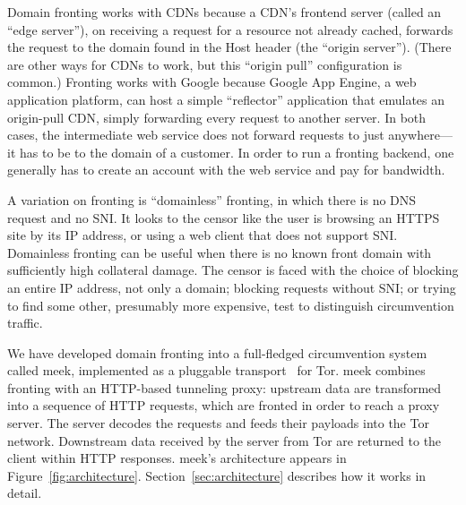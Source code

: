 \documentclass{sig-alternate}
\newcommand{\meek}{meek\xspace}
\begin{document}
Domain fronting works with CDNs because a CDN's frontend server
(called an ``edge server''),
on receiving a request for a resource not already cached,
forwards the request to the domain found in the Host header
(the ``origin server'').
(There are other ways for CDNs to work, but this ``origin pull''
configuration is common.)
Fronting works with Google because Google App Engine, a web application platform,
can host a simple ``reflector'' application that emulates
an origin-pull CDN, simply forwarding every request to another server.
In both cases, the intermediate web service does not forward requests to just anywhere---it
has to be to the domain of a customer.
In order to run a fronting backend,
one generally has to create an account with the web service and pay for bandwidth.

A variation on fronting is ``domainless'' fronting,
in which there is no DNS request and no SNI.
It looks to the censor
like the user is browsing an HTTPS site by its IP address,
or using a web client that does not support SNI.
Domainless fronting can be useful when there is no known front domain
with sufficiently high collateral damage.
The censor is faced with the choice of blocking an entire IP address, not only a domain;
blocking requests without SNI;
or trying to find some other, presumably more expensive, test to distinguish
circumvention traffic.

We have developed domain fronting into a full-fledged circumvention system called \meek,
implemented as a pluggable transport~\cite{pt} for Tor.
\meek combines fronting with an HTTP-based tunneling proxy:
upstream data are transformed into a sequence of HTTP requests,
which are fronted in order to reach a proxy server.
The server decodes the requests and feeds their payloads
into the Tor network.
Downstream data received by the server from Tor
are returned to the client within HTTP responses.
\meek's architecture appears in Figure~\ref{fig:architecture}.
Section~\ref{sec:architecture} describes how it works in detail.
\end{document}
